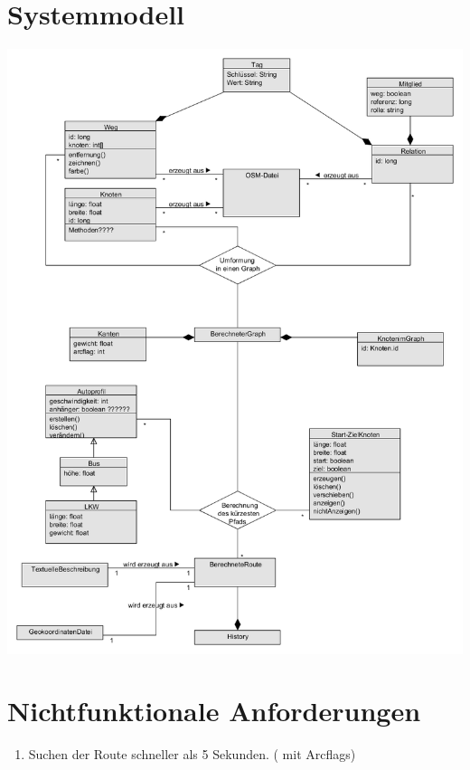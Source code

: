 \documentclass[a4paper, 11pt]{article}
\begin{document}
\section{Systemmodell}
\includegraphics[width=\linewidth]{Systemmodell1}
\section{Nichtfunktionale Anforderungen}

\begin{enumerate}
\item Suchen der Route schneller als 5 Sekunden. (  mit Arcflags)

\end{enumerate}
\end{document}
